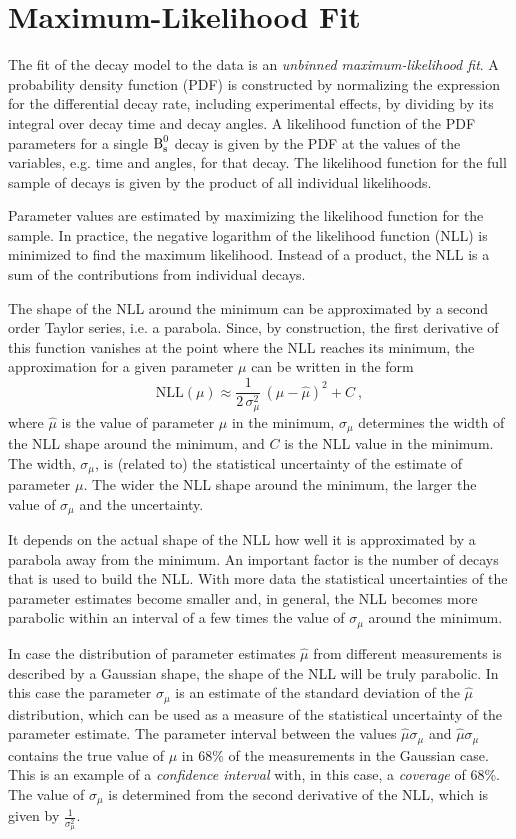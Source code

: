 \section{Maximum-Likelihood Fit}
\label{sec:ana_fit}

The fit of the decay model to the data is an \emph{unbinned maximum-likelihood fit}. A probability density function (PDF) is constructed by
normalizing the expression for the differential decay rate, including experimental effects, by dividing by its integral over decay time and
decay angles. A likelihood function of the PDF parameters for a single $\text{B}_\text{s}^\text{0}$ decay is given by the PDF at the values of the variables, e.g.
time and angles, for that decay. The likelihood function for the full sample of decays is given by the product of all individual
likelihoods.

Parameter values are estimated by maximizing the likelihood function for the sample. In practice, the negative logarithm of the likelihood
function (NLL) is minimized to find the maximum likelihood. Instead of a product, the NLL is a sum of the contributions from individual
decays.

The shape of the NLL around the minimum can be approximated by a second order Taylor series, i.e. a parabola. Since, by construction, the
first derivative of this function vanishes at the point where the NLL reaches its minimum, the approximation for a given parameter $\mu$
can be written in the form
\begin{equation}
  \label{eq:NLLPara}
  \text{NLL}(\mu) \approx \frac{1}{2\,\sigma_\mu^2}\, (\mu-\hat{\mu})^2 + C \ ,
\end{equation}
where $\hat{\mu}$ is the value of parameter $\mu$ in the minimum, $\sigma_\mu$ determines the width of the NLL shape around the minimum,
and $C$ is the NLL value in the minimum. The width, $\sigma_\mu$, is (related to) the statistical uncertainty of the estimate of parameter
$\mu$. The wider the NLL shape around the minimum, the larger the value of $\sigma_\mu$ and the uncertainty.

It depends on the actual shape of the NLL how well it is approximated by a parabola away from the minimum. An important factor is the
number of decays that is used to build the NLL. With more data the statistical uncertainties of the parameter estimates become smaller and,
in general, the NLL becomes more parabolic within an interval of a few times the value of $\sigma_\mu$ around the minimum.

In case the distribution of parameter estimates $\hat{\mu}$ from different measurements is described by a Gaussian shape, the shape of the
NLL will be truly parabolic. In this case the parameter $\sigma_\mu$ is an estimate of the standard deviation of the $\hat{\mu}$
distribution, which can be used as a measure of the statistical uncertainty of the parameter estimate. The parameter interval between
the values $\hat{\mu}$\textminus$\sigma_\mu$ and $\hat{\mu}$\textplus$\sigma_\mu$ contains the true value of $\mu$ in 68\% of the
measurements in the Gaussian case. This is an example of a \emph{confidence interval} with, in this case, a \emph{coverage} of 68\%. The
value of $\sigma_\mu$ is determined from the second derivative of the NLL, which is given by $\frac{1}{\sigma_\mu^2}$.

